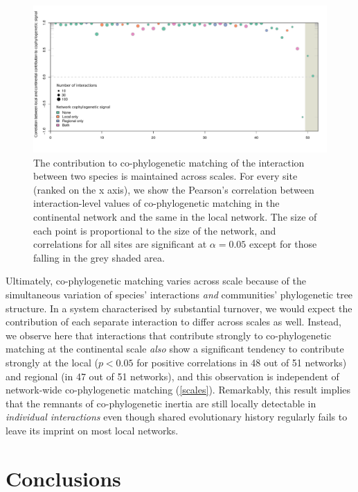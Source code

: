 \documentclass[12pt]{article}
\begin{document}
\begin{figure}[htbp]
\centering
\includegraphics[width=1.00000\textwidth]{figures/figure2.pdf}
\caption{The contribution to co-phylogenetic matching of the interaction
between two species is maintained across scales. For every site (ranked
on the x axis), we show the Pearson's correlation between
interaction-level values of co-phylogenetic matching in the continental
network and the same in the local network. The size of each point is
proportional to the size of the network, and correlations for all sites
are significant at \(\alpha = 0.05\) except for those falling in the
grey shaded area.\label{fig:scales}}
\end{figure}

Ultimately, co-phylogenetic matching varies across scale because of the
simultaneous variation of species' interactions \emph{and} communities'
phylogenetic tree structure. In a system characterised by substantial
turnover, we would expect the contribution of each separate interaction
to differ across scales as well. Instead, we observe here that
interactions that contribute strongly to co-phylogenetic matching at the
continental scale \emph{also} show a significant tendency to contribute
strongly at the local (\(p < 0.05\) for positive correlations in 48 out
of 51 networks) and regional (in 47 out of 51 networks), and this
observation is independent of network-wide co-phylogenetic matching
(\autoref{scales}). Remarkably, this result implies that the remnants of
co-phylogenetic inertia are still locally detectable in \emph{individual
interactions} even though shared evolutionary history regularly fails to
leave its imprint on most local networks.

\section{Conclusions}\label{conclusions}
\end{document}
